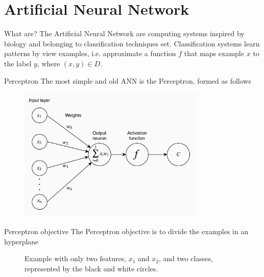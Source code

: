 \documentclass[xcolor={usenames}]{beamer}
\begin{document}
  \section{Artificial Neural Network}
  \begin{frame}{What are?}
  	The Artificial Neural Network are computing systems inspired by biology and belonging to classification techniques set. Classification systems learn patterns by view examples, i.e. approximate a function $f$ that maps example $x$ to the label $y$, where $(x, y) \in D$.
  \end{frame}
  \begin{frame}{Perceptron}
  	The most simple and old ANN \cite{ROSE:1958} is the Perceptron, formed as follows
  	\begin{figure}[t]
		\centering
		\includegraphics[width=0.8\textwidth]{../figures/perceptron.png}
	\end{figure}	
  \end{frame}
  \begin{frame}{Perceptron objective}
  	The Perceptron objective is to divide the examples in an hyperplane
  	\begin{figure}[t!]
		\centering		
		
		\caption{Example with only two features, $x_1$ and $x_2$, and two classes, represented by the black and white circles.}
		
	\end{figure}
  \end{frame}
\end{document}
